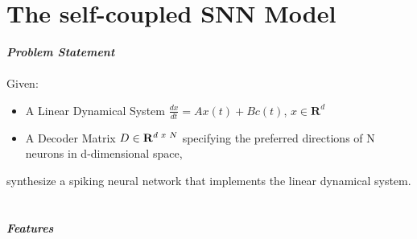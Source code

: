 \section{The self-coupled SNN Model}

\textit{\textbf{Problem Statement}}
\\
\\
 Given:

\begin{itemize}
    \item A Linear Dynamical System  $\frac{dx}{dt} = A x(t) + B c(t)$,  $x \in \mathbf{R}^d$
    
    \item A Decoder Matrix $D \in \mathbf{R}^{d\hspace{1mm} x \hspace{1mm}N}$ specifying the preferred directions of N neurons in d-dimensional space,
    
\end{itemize}
synthesize a spiking neural network that implements the linear dynamical system.   
\\
\\
\\
\textbf{\textit{Features}}
\\
